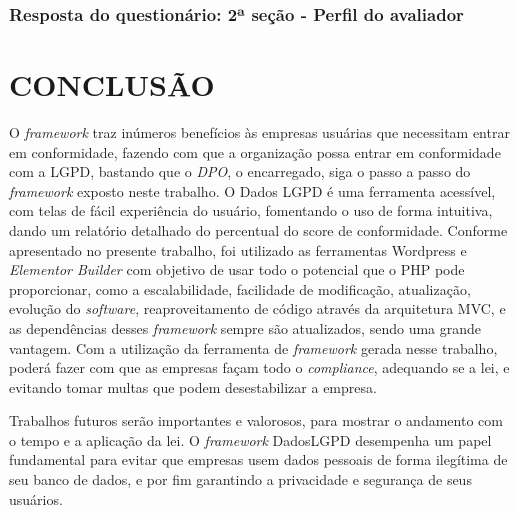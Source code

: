 \documentclass[
	12pt,				%
	openright,			%
	oneside,			%
	a4paper,			%
	english,			%
	french,				%
	spanish,			%
	brazil,				%
	]{abntex2}
\begin{document}
 \subsection{Resposta do questionário: 2ª seção - Perfil do avaliador}







 \chapter{CONCLUSÃO}
 \label{ch: conclusao}
 O \textit{framework} traz inúmeros benefícios às empresas usuárias que necessitam entrar em conformidade, fazendo com que a organização possa entrar em conformidade com a LGPD, bastando que o \textit{DPO}, o encarregado, siga o passo a passo do \textit{framework} exposto neste trabalho. O Dados LGPD é uma ferramenta acessível, com telas de fácil experiência do usuário, fomentando o uso de forma intuitiva, dando um relatório detalhado do percentual do score de conformidade. Conforme apresentado no presente trabalho, foi utilizado as ferramentas Wordpress e \textit{Elementor Builder} com objetivo de usar todo o potencial que o PHP pode proporcionar, como a escalabilidade, facilidade de modificação, atualização, evolução do \textit{software}, reaproveitamento de código através da arquitetura MVC, e as dependências desses \textit{framework} sempre são atualizados, sendo uma grande vantagem. Com a utilização da ferramenta de \textit{framework} gerada nesse trabalho, poderá fazer com que as empresas façam todo o \textit{compliance}, adequando se a lei, e evitando tomar multas que podem desestabilizar a empresa.

Trabalhos futuros serão importantes e valorosos, para mostrar o andamento com o tempo e a aplicação da lei. O \textit{\textit{framework} } DadosLGPD desempenha um papel fundamental para evitar que empresas usem dados pessoais de forma ilegítima de seu banco de dados, e por fim garantindo a privacidade e segurança de seus usuários.




% 
\end{document}
